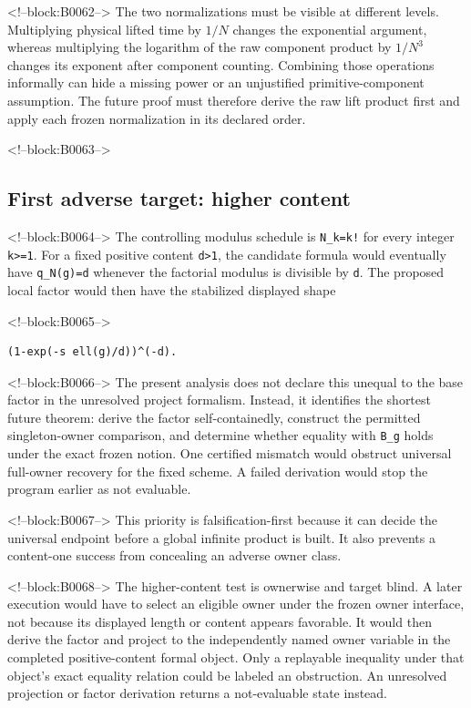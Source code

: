 \documentclass[11pt]{article}
\begin{document}
<!--block:B0062-->
The two normalizations must be visible at different levels. Multiplying
physical lifted time by $1/N$ changes the exponential argument, whereas
multiplying the logarithm of the raw component product by $1/N^3$
changes its exponent after component counting. Combining those
operations informally can hide a missing power or an unjustified
primitive-component assumption. The future proof must therefore derive
the raw lift product first and apply each frozen normalization in its
declared order.

<!--block:B0063-->
\hypertarget{42-first-adverse-target-higher-content}{%
\subsection{First adverse target: higher
content}\label{42-first-adverse-target-higher-content}}

<!--block:B0064-->
The controlling modulus schedule is \texttt{N\_k=k!} for every integer
\texttt{k\textgreater{}=1}. For a fixed positive content
\texttt{d\textgreater{}1}, the candidate formula would eventually have
\texttt{q\_N(g)=d} whenever the factorial modulus is divisible by
\texttt{d}. The proposed local factor would then have the stabilized
displayed shape

<!--block:B0065-->
\begin{verbatim}
(1-exp(-s ell(g)/d))^(-d).
\end{verbatim}

<!--block:B0066-->
The present analysis does not declare this unequal to the base factor in the
unresolved project formalism. Instead, it identifies the shortest future
theorem: derive the factor self-containedly, construct the permitted
singleton-owner comparison, and determine whether equality with
\texttt{B\_g} holds under the exact frozen notion. One certified
mismatch would obstruct universal full-owner recovery for the fixed
scheme. A failed derivation would stop the program earlier as not
evaluable.

<!--block:B0067-->
This priority is falsification-first because it can decide the universal
endpoint before a global infinite product is built. It also prevents a
content-one success from concealing an adverse owner class.

<!--block:B0068-->
The higher-content test is ownerwise and target blind. A later execution
would have to select an eligible owner under the frozen owner interface,
not because its displayed length or content appears favorable. It would
then derive the factor and project to the independently named owner
variable in the completed positive-content formal object. Only a
replayable inequality under that object's exact equality relation could
be labeled an obstruction. An unresolved projection or factor
derivation returns a not-evaluable state instead.
\end{document}
